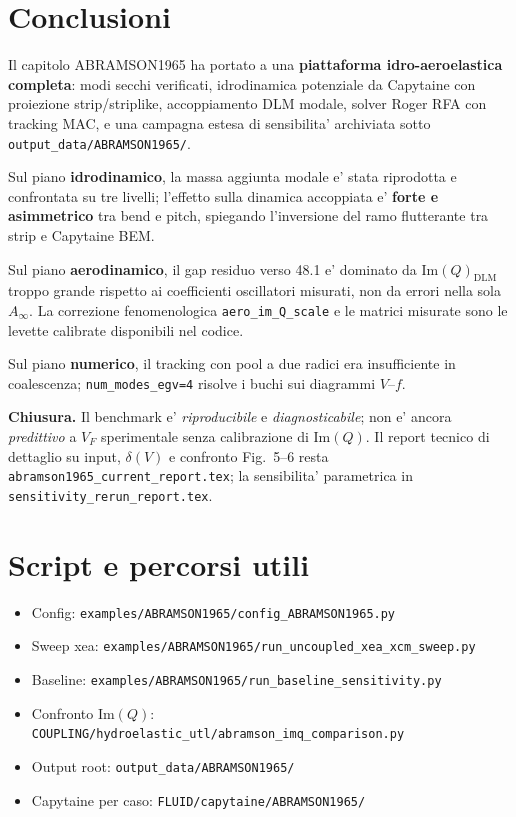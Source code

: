 \documentclass[11pt,a4paper]{article}
\begin{document}
\section{Conclusioni}

Il capitolo ABRAMSON1965 ha portato a una \textbf{piattaforma idro-aeroelastica completa}:
modi secchi verificati, idrodinamica potenziale da Capytaine con proiezione strip/striplike,
accoppiamento DLM modale, solver Roger RFA con tracking MAC, e una campagna estesa di
sensibilita' archiviata sotto \texttt{output\_data/ABRAMSON1965/}.

Sul piano \textbf{idrodinamico}, la massa aggiunta modale e' stata riprodotta e confrontata
su tre livelli; l'effetto sulla dinamica accoppiata e' \textbf{forte e asimmetrico} tra
bend e pitch, spiegando l'inversione del ramo flutterante tra strip e Capytaine BEM.

Sul piano \textbf{aerodinamico}, il gap residuo verso \SI{48.1}{\knunit} e' dominato da
$\mathrm{Im}(Q)_\mathrm{DLM}$ troppo grande rispetto ai coefficienti oscillatori misurati,
non da errori nella sola $A_\infty$.
La correzione fenomenologica \texttt{aero\_im\_Q\_scale} e le matrici misurate sono le
levette calibrate disponibili nel codice.

Sul piano \textbf{numerico}, il tracking con pool a due radici era insufficiente in
coalescenza; \texttt{num\_modes\_egv=4} risolve i buchi sui diagrammi $V$--$f$.

\medskip
\noindent\textbf{Chiusura.}
Il benchmark e' \emph{riproducibile} e \emph{diagnosticabile}; non e' ancora \emph{predittivo}
a $V_F$ sperimentale senza calibrazione di $\mathrm{Im}(Q)$.
Il report tecnico di dettaglio su input, $\delta(V)$ e confronto Fig.~5--6 resta
\texttt{abramson1965\_current\_report.tex}; la sensibilita' parametrica in
\texttt{sensitivity\_rerun\_report.tex}.

\appendix
\section{Script e percorsi utili}

\begin{itemize}[nosep]
  \item Config: \texttt{examples/ABRAMSON1965/config\_ABRAMSON1965.py}
  \item Sweep xea: \texttt{examples/ABRAMSON1965/run\_uncoupled\_xea\_xcm\_sweep.py}
  \item Baseline: \texttt{examples/ABRAMSON1965/run\_baseline\_sensitivity.py}
  \item Confronto $\mathrm{Im}(Q)$: \texttt{COUPLING/hydroelastic\_utl/abramson\_imq\_comparison.py}
  \item Output root: \texttt{output\_data/ABRAMSON1965/}
  \item Capytaine per caso: \texttt{FLUID/capytaine/ABRAMSON1965/}
\end{itemize}
\end{document}
